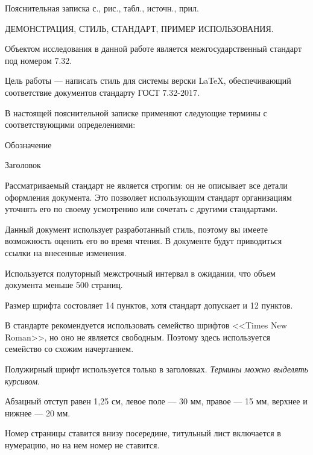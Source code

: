 






Пояснительная записка \pageref{LastPage} с.,  рис.,
 табл.,  источн.,  прил.

ДЕМОНСТРАЦИЯ, СТИЛЬ, СТАНДАРТ, ПРИМЕР ИСПОЛЬЗОВАНИЯ.

Объектом исследования в данной работе является межгосударственный стандарт под
номером 7.32.

Цель работы --- написать стиль для системы верски \LaTeX, обеспечивающий
соответствие документов стандарту ГОСТ 7.32-2017.




В настоящей пояснительной записке применяют следующие термины с
соответствующими определениями:

Обозначение

Заголовок


Рассматриваемый стандарт не является строгим: он не описывает все детали
оформления документа. Это позволяет использующим стандарт организациям уточнять
его по своему усмотрению или сочетать с другими стандартами.

Данный документ использует разработанный стиль, поэтому вы имеете возможность
оценить его во время чтения. В документе будут приводиться ссылки на внесенные
изменения.

Используется полуторный межстрочный интервал в ожидании, что объем документа
меньше 500 страниц.

Размер шрифта состовляет 14 пунктов, хотя стандарт допускает и 12 пунктов.

В стандарте рекомендуется использовать семейство шрифтов <<Times New Roman>>,
но оно не является свободным. Поэтому здесь используется семейство со схожим
начертанием.

Полужирный шрифт используется только в заголовках. \emph{Термины можно выделять
курсивом}.

Абзацный отступ равен 1,25 см, левое поле --- 30 мм, правое --- 15 мм, верхнее
и нижнее --- 20 мм.

Номер страницы ставится внизу посередине, титульный лист включается в
нумерацию, но на нем номер не ставится.

